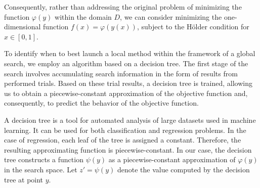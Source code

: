 \documentclass[runningheads]{llncs}
\begin{document}
Consequently, rather than addressing the original problem of minimizing the function $\varphi(y)$ within the domain $D$, we can consider minimizing the one-dimensional function $f(x)=\varphi(y(x))$, subject to the Hölder condition for $x \in [0, 1]$.


To identify when to best launch a local method  within the framework of a global search, we employ an algorithm based on a decision tree. The first stage of the search involves accumulating search information in the form of results from performed trials. Based on these trial results, a decision tree is trained, allowing us to obtain a piecewise-constant approximation of the objective function and, consequently, to predict the behavior of the objective function.

A decision tree is a tool for automated analysis of large datasets used in machine learning. It can be used for both classification and regression problems. In the case of regression, each leaf of the tree is assigned a constant. Therefore, the resulting approximating function is piecewise-constant. In our case, the decision tree constructs a function $\psi(y)$ as a piecewise-constant approximation of $\varphi(y)$ in the search space. Let $z' = \psi(y)$ denote the value computed by the decision tree at point $y$.
\end{document}
